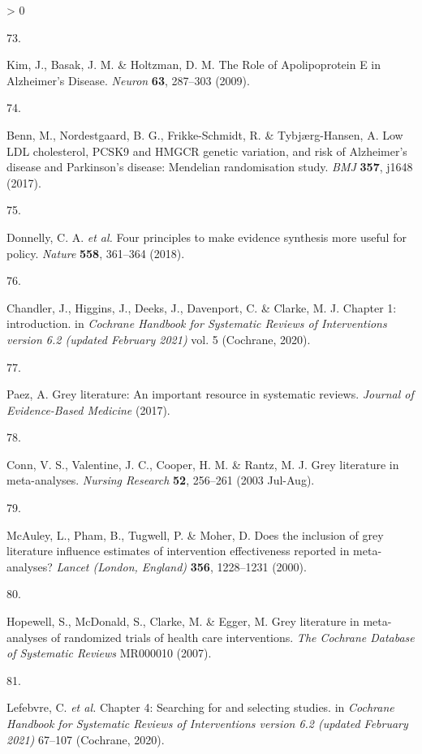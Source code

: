 \documentclass[a4paper, twoside]{templates/ociamthesis}
\newlength{\cslhangindent}
\newlength{\csllabelwidth}
\newenvironment{CSLReferences}[3] %
 {%
  \setlength{\parindent}{0pt}
  \ifodd #1 \everypar{\setlength{\hangindent}{\cslhangindent}}\ignorespaces\fi
  \ifnum #2 > 0
  \setlength{\parskip}{#2\baselineskip}
  \fi
 }%
 {}
\newcommand{\CSLLeftMargin}[1]{\parbox[t]{\maxof{\widthof{#1}}{\csllabelwidth}}{#1}}
\newcommand{\CSLRightInline}[1]{\parbox[t]{\linewidth - \csllabelwidth}{#1}}
\begin{document}
\begin{CSLReferences}{0}{0}
\leavevmode\hypertarget{ref-kim2009}{}%
\CSLLeftMargin{73. }
\CSLRightInline{Kim, J., Basak, J. M. \& Holtzman, D. M. The {Role} of {Apolipoprotein E} in {Alzheimer}'s {Disease}. \emph{Neuron} \textbf{63}, 287--303 (2009).}

\leavevmode\hypertarget{ref-benn2017}{}%
\CSLLeftMargin{74. }
\CSLRightInline{Benn, M., Nordestgaard, B. G., Frikke-Schmidt, R. \& Tybjærg-Hansen, A. Low {LDL} cholesterol, {PCSK9} and {HMGCR} genetic variation, and risk of {Alzheimer}'s disease and {Parkinson}'s disease: Mendelian randomisation study. \emph{BMJ} \textbf{357}, j1648 (2017).}

\leavevmode\hypertarget{ref-donnelly2018}{}%
\CSLLeftMargin{75. }
\CSLRightInline{Donnelly, C. A. \emph{et al.} Four principles to make evidence synthesis more useful for policy. \emph{Nature} \textbf{558}, 361--364 (2018).}

\leavevmode\hypertarget{ref-chandler2019chapter}{}%
\CSLLeftMargin{76. }
\CSLRightInline{Chandler, J., Higgins, J., Deeks, J., Davenport, C. \& Clarke, M. J. Chapter 1: introduction. in \emph{Cochrane {Handbook} for {Systematic Reviews} of {Interventions} version 6.2 (updated {February} 2021)} vol. 5 ({Cochrane}, 2020).}

\leavevmode\hypertarget{ref-paez2017}{}%
\CSLLeftMargin{77. }
\CSLRightInline{Paez, A. Grey literature: An important resource in systematic reviews. \emph{Journal of Evidence-Based Medicine} (2017).}

\leavevmode\hypertarget{ref-conn2003}{}%
\CSLLeftMargin{78. }
\CSLRightInline{Conn, V. S., Valentine, J. C., Cooper, H. M. \& Rantz, M. J. Grey literature in meta-analyses. \emph{Nursing Research} \textbf{52}, 256--261 (2003 Jul-Aug).}

\leavevmode\hypertarget{ref-mcauley2000}{}%
\CSLLeftMargin{79. }
\CSLRightInline{McAuley, L., Pham, B., Tugwell, P. \& Moher, D. Does the inclusion of grey literature influence estimates of intervention effectiveness reported in meta-analyses? \emph{Lancet (London, England)} \textbf{356}, 1228--1231 (2000).}

\leavevmode\hypertarget{ref-hopewell2007}{}%
\CSLLeftMargin{80. }
\CSLRightInline{Hopewell, S., McDonald, S., Clarke, M. \& Egger, M. Grey literature in meta-analyses of randomized trials of health care interventions. \emph{The Cochrane Database of Systematic Reviews} MR000010 (2007).}

\leavevmode\hypertarget{ref-lefebvre2019searching}{}%
\CSLLeftMargin{81. }
\CSLRightInline{Lefebvre, C. \emph{et al.} Chapter 4: Searching for and selecting studies. in \emph{Cochrane {Handbook} for {Systematic Reviews} of {Interventions} version 6.2 (updated {February} 2021)} 67--107 ({Cochrane}, 2020).}


\end{CSLReferences}
\end{document}
